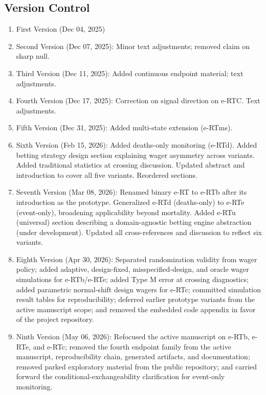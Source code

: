 \documentclass[10pt]{article}
\begin{document}
\subsection{Version Control}
\begin{enumerate}
    \item First Version (Dec 04, 2025)
    \item Second Version (Dec 07, 2025): Minor text adjustments; removed claim on sharp null.
    \item Third Version (Dec 11, 2025): Added continuous endpoint material; text adjustments.
    \item Fourth Version (Dec 17, 2025): Correction on signal direction on e-RTC. Text adjustments.
    \item Fifth Version (Dec 31, 2025): Added multi-state extension (e-RTms).
    \item Sixth Version (Feb 15, 2026): Added deaths-only monitoring (e-RTd). Added betting strategy design section explaining wager asymmetry across variants. Added traditional statistics at crossing discussion. Updated abstract and introduction to cover all five variants. Reordered sections.
    \item Seventh Version (Mar 08, 2026): Renamed binary e-RT to e-RTb after its introduction as the prototype. Generalized e-RTd (deaths-only) to e-RTe (event-only), broadening applicability beyond mortality. Added e-RTu (universal) section describing a domain-agnostic betting engine abstraction (under development). Updated all cross-references and discussion to reflect six variants.
    \item Eighth Version (Apr 30, 2026): Separated randomization validity from wager policy; added adaptive, design-fixed, misspecified-design, and oracle wager simulations for e-RTb/e-RTe; added Type M error at crossing diagnostics; added parametric normal-shift design wagers for e-RTc; committed simulation result tables for reproducibility; deferred earlier prototype variants from the active manuscript scope; and removed the embedded code appendix in favor of the project repository.
    \item Ninth Version (May 06, 2026): Refocused the active manuscript on e-RTb, e-RTe, and e-RTc; removed the fourth endpoint family from the active manuscript, reproducibility chain, generated artifacts, and documentation; removed parked exploratory material from the public repository; and carried forward the conditional-exchangeability clarification for event-only monitoring.
\end{enumerate}



\end{document}
